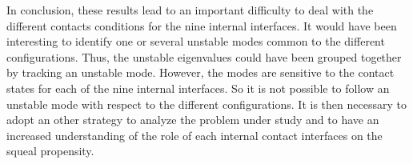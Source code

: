 \documentclass[final,1p]{elsarticle}
\begin{document}
In conclusion, these results lead to an important difficulty to deal with the different contacts conditions for the nine internal interfaces. It would have been interesting to identify one or several unstable modes common to the different configurations. Thus, the unstable eigenvalues could have been grouped together by tracking an unstable mode. However, the modes are sensitive to the contact states for each of the nine internal interfaces. So it is not possible to follow an unstable mode with respect to the different configurations. It is then necessary to adopt an other strategy to analyze the problem under study and to have an increased understanding of the role of each internal contact interfaces on the squeal propensity.




\end{document}

